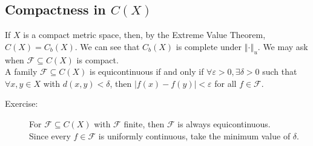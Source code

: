 \documentclass[9pt]{extarticle}
\newcommand{\norm}[1]{\left\Vert #1 \right\Vert}
\begin{document}
  \subsection{Compactness in $C(X)$}%
  If $X$ is a compact metric space, then, by the Extreme Value Theorem, $C(X) = C_b(X)$. We can see that $C_b(X)$ is complete under $\norm{\cdot}_u$. We may ask when $\mathcal{F}\subseteq C(X)$ is compact.\\

  A family $\mathcal{F}\subseteq C(X)$ is equicontinuous if and only if $\forall \varepsilon > 0, \exists \delta > 0$ such that $\forall x,y\in X$ with $d(x,y) < \delta$, then $|f(x)-f(y)| < \varepsilon$ for all $f\in \mathcal{F}$.
  \begin{description}
    \item[Exercise:] For $\mathcal{F}\subseteq C(X)$ with $\mathcal{F}$ finite, then $\mathcal{F}$ is always equicontinuous.\\

      Since every $f\in \mathcal{F}$ is uniformly continuous, take the minimum value of $\delta$.
  \end{description}
\end{document}
